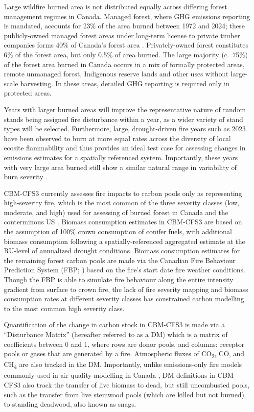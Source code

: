 \documentclass[, manuscript]{copernicus}
\begin{document}
Large wildfire burned area is not distributed equally across differing
forest management regimes in Canada. Managed forest, where GHG emissions
reporting is mandated, accounts for 23\% of the area burned between 1972
and 2024; these publicly-owned managed forest areas under long-term
license to private timber companies forms 40\% of Canada's forest area
\citep{stinson2019}. Privately-owned forest constitutes 6\% of the
forest area, but only 0.5\% of area burned. The large majority (c.~75\%)
of the forest area burned in Canada occurs in a mix of formally
protected areas, remote unmanaged forest, Indigenous reserve lands and
other uses without large-scale harvesting. In these areas, detailed GHG
reporting is required only in protected areas.

Years with larger burned areas will improve the representative nature of
random stands being assigned fire disturbance within a year, as a wider
variety of stand types will be selected. Furthermore, large,
drought-driven fire years such as 2023 have been observed to burn at
more equal rates across the diversity of local ecosite flammability
\citep{parks2018, whitman2024} and thus provides an ideal test case for
assessing changes in emissions estimates for a spatially referenced
system. Importantly, these years with very large area burned still show
a similar natural range in variability of burn severity
\citep{whitman2018}.

CBM-CFS3 currently assesses fire impacts to carbon pools only as
representing high-severity fire, which is the most common of the three
severity classes (low, moderate, and high) used for assessing of burned
forest in Canada \citep{hall2008} and the conterminous US
\citep{eidenshink2007}. Biomass consumption estimates in CBM-CFS3 are
based on the assumption of 100\% crown consumption of conifer fuels,
with additional biomass consumption following a spatially-referenced
aggregated estimate at the RU-level of annualized drought conditions.
Biomass consumption estimates for the remaining forest carbon pools are
made via the Canadian Fire Behaviour Prediction System (FBP;
\citet{forestrycanadafiredangerratinggroup1992}) based on the fire's
start date fire weather conditions. Though the FBP is able to simulate
fire behaviour along the entire intensity gradient from surface to crown
fire, the lack of fire severity mapping and biomass consumption rates at
different severity classes has constrained carbon modelling to the most
common high severity class.

Quantification of the change in carbon stock in CBM-CFS3 is made via a
``Disturbance Matrix'' (hereafter referred to as a DM) which is a matrix
of coefficients between 0 and 1, where rows are donor pools, and
columns: receptor pools or gases that are generated by a fire.
Atmospheric fluxes of CO\textsubscript{2}, CO, and CH\textsubscript{4}
are also tracked in the DM. Importantly, unlike emissions-only fire
models commonly used in air quality modelling in Canada
\citep{chen2019}, DM definitions in CBM-CFS3 also track the transfer of
live biomass to dead, but still uncombusted pools, such as the transfer
from live stemwood pools (which are killed but not burned) to standing
deadwood, also known as snags.
\end{document}
